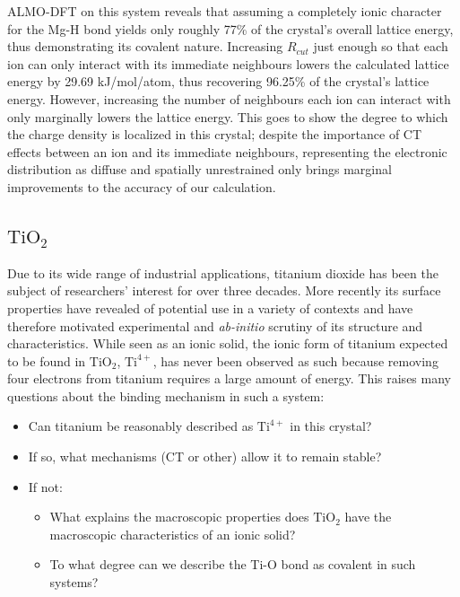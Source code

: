 \documentclass[aps,prb,twocolumn,amsmath,amssymb,superscriptaddress,longbibliography]{revtex4-1}
\begin{document}
ALMO-DFT on this system reveals that assuming a completely ionic character for the Mg-H bond yields only roughly 77\% of the crystal's overall lattice energy, thus demonstrating its covalent nature. 
Increasing $R_{cut}$ just enough so that each ion can only interact with its immediate neighbours lowers the calculated lattice energy by 29.69 kJ/mol/atom, thus recovering 96.25\% of the crystal's lattice energy. 
However, increasing the number of neighbours each ion can interact with only marginally lowers the lattice energy. 
This goes to show the degree to which the charge density is localized in this crystal; despite the importance of CT effects between an ion and its immediate neighbours, representing the electronic distribution as diffuse and spatially unrestrained only brings marginal improvements to the accuracy of our calculation.




\subsection*{$\text{TiO}_{2}$}


Due to its wide range of industrial applications, titanium dioxide has been the subject of researchers' interest for over three decades.
More recently its surface properties have revealed of potential use in a variety of contexts and have therefore motivated experimental and \emph{ab-initio} scrutiny of its structure and characteristics. 
While seen as an ionic solid, the ionic form of titanium expected to be found in $\text{TiO}_{2}$, $\text{Ti}^{4+}$, has never been observed as such because removing four electrons from titanium requires a large amount of energy. 
This raises many questions about the binding mechanism in such a system:

\begin{itemize}
\item Can titanium be reasonably described as $\text{Ti}^{4+}$ in this crystal?
\item If so, what mechanisms (CT or other) allow it to remain stable?
\item If not:
	\begin{itemize}
	\item What explains the macroscopic properties does $\text{TiO}_{2}$ have the macroscopic characteristics of an ionic solid?
	\item To what degree can we describe the Ti-O bond as covalent in such systems?
	\end{itemize}
\end{itemize}
\end{document}
